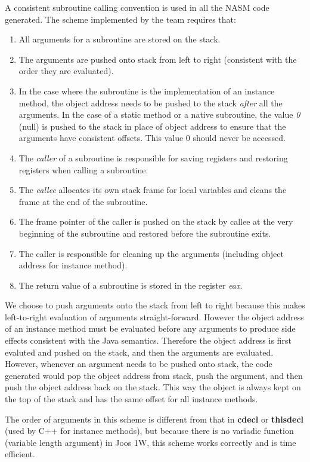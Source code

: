 \documentclass[a4paper, notitlepage]{report}
\begin{document}
A consistent subroutine calling convention is used in all the NASM code generated. The scheme implemented by the team requires that:
\begin{enumerate}
\item All arguments for a subroutine are stored on the stack.
\item The arguments are pushed onto stack from left to right (consistent with the order they are evaluated).
\item In the case where the subroutine is the implementation of an instance method, the object address needs to be pushed to the stack \emph{after} all the arguments. In the case of a static method or a native subroutine, the value \emph{0} (null) is pushed to the stack in place of object address to ensure that the arguments have consistent offsets. This value 0 should never be accessed.
\item The \emph{caller} of a subroutine is responsible for saving registers and restoring registers when calling a subroutine.
\item The \emph{callee} allocates its own stack frame for local variables and cleans the frame at the end of the subroutine.
\item The frame pointer of the caller is pushed on the stack by callee at the very beginning of the subroutine and restored before the subroutine exits. 
\item The caller is responsible for cleaning up the arguments (including object address for instance method).
\item The return value of a subroutine is stored in the register \emph{eax}.
\end{enumerate}

We choose to push arguments onto the stack from left to right because this makes left-to-right evaluation of arguments straight-forward. However the object address of an instance method must be evaluated before any arguments to produce side effects consistent with the Java semantics. Therefore the object address is first evaluted and pushed on the stack, and then the arguments are evaluated. However, whenever an argument needs to be pushed onto stack, the code generated would pop the object address from stack, push the argument, and then push the object address back on the stack. This way the object is always kept on the top of the stack and has the same offset for all instance methods.

The order of arguments in this scheme is different from that in \textbf{cdecl} or \textbf{thisdecl} (used by C++ for instance methods), but because there is no variadic function (variable length argument) in Joos 1W, this scheme works correctly and is time efficient.
\end{document}
